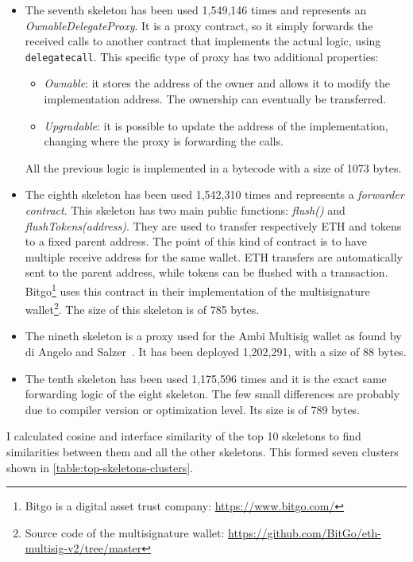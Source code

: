 \begin{itemize}
    \item The seventh skeleton has been used 1,549,146 times and represents an \textit{OwnableDelegateProxy}. It is a proxy contract, so it simply forwards the received calls to another contract that implements the actual logic, using {\tt delegatecall}. This specific type of proxy has two additional properties:
    \begin{itemize}
        \item \textit{Ownable}: it stores the address of the owner and allows it to modify the implementation address. The ownership can eventually be transferred.
        \item \textit{Upgradable}: it is possible to update the address of the implementation, changing where the proxy is forwarding the calls.
    \end{itemize}
    All the previous logic is implemented in a bytecode with a size of 1073 bytes.

    \item The eighth skeleton has been used 1,542,310 times and represents a \textit{forwarder contract}. This skeleton has two main public functions: \textit{flush()} and \textit{flushTokens(address)}. They are used to transfer respectively ETH and tokens to a fixed parent address. The point of this kind of contract is to have multiple receive address for the same wallet. ETH transfers are automatically sent to the parent address, while tokens can be flushed with a transaction. Bitgo\footnote{Bitgo is a digital asset trust company: \url{https://www.bitgo.com/}} uses this contract in their implementation of the multisignature wallet\footnote{Source code of the multisignature wallet: \url{https://github.com/BitGo/eth-multisig-v2/tree/master}}. The size of this skeleton is of 785 bytes.

    \item The nineth skeleton is a proxy used for the Ambi Multisig wallet as found by di Angelo and Salzer~\cite{wallet-contracts}. It has been deployed 1,202,291, with a size of 88 bytes. 

    \item The tenth skeleton has been used 1,175,596 times and it is the exact same forwarding logic of the eight skeleton. The few small differences are probably due to compiler version or optimization level. Its size is of 789 bytes.
    
\end{itemize}

I calculated cosine and interface similarity of the top 10 skeletons to find similarities between them and all the other skeletons. This formed seven clusters shown in \cref{table:top-skeletons-clusters}.

